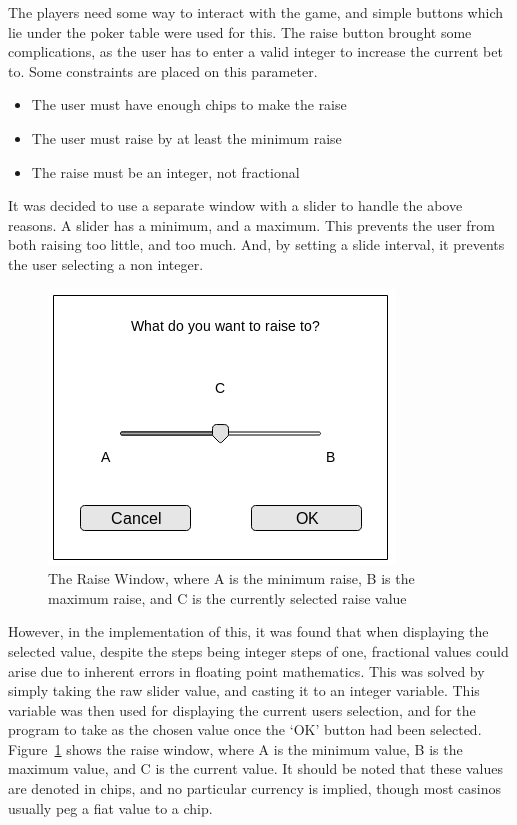 The players need some way to interact with the game, and simple buttons which 
lie under the poker table were used for this. The raise button brought some 
complications, as the user has to enter a valid integer to increase the current
bet to. Some constraints are placed on this parameter.

\begin{itemize}
\item The user must have enough chips to make the raise
\item The user must raise by at least the minimum raise
\item The raise must be an integer, not fractional
\end{itemize}

It was decided to use a separate window with a slider to handle the above
reasons. A slider has a minimum, and a maximum. This prevents the user from
both raising too little, and too much. And, by setting a slide interval, it
prevents the user selecting a non integer.

\begin{figure}[h]
    \centering
    \includegraphics[width=0.5\linewidth]{../images/raisewindow.png}
    \caption{The Raise Window, where A is the minimum raise, B is the maximum
             raise, and C is the currently selected raise value}%
    \label{fig:raisewindow}
\end{figure}

However, in the implementation of this, it was found that when displaying
the selected value, despite the steps being integer steps of one, 
fractional values could arise due to inherent errors in floating point 
mathematics. This was solved by simply taking the raw slider value, and 
casting it to an integer variable. This variable was then used for displaying 
the current users selection, and for the program to take as the chosen value 
once the `OK' button had been selected. Figure~\ref{fig:raisewindow} shows the 
raise window, where A is the minimum value, B is the maximum value, and C is 
the current value. It should be noted that these values are denoted in chips,
and no particular currency is implied, though most casinos usually peg a
fiat value to a chip.

